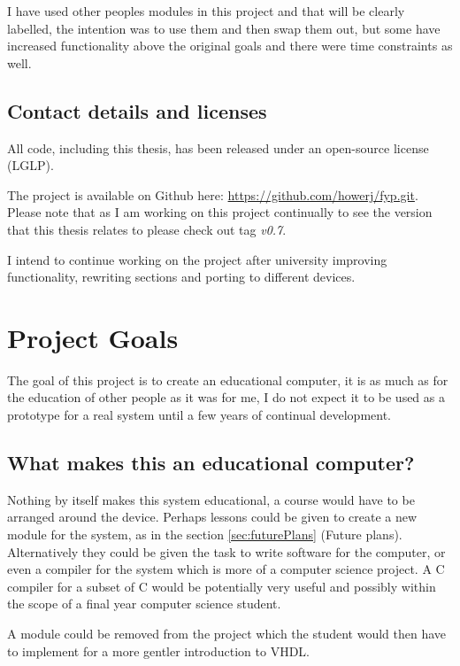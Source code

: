 \documentclass	[a4paper, 10pt]	{article}
\begin{document}
  I have used other peoples modules in this project and that will be clearly labelled,
  the intention was to use them and then swap them out, but some have increased
  functionality above the original goals and there were time constraints as well.

  \subsection{Contact details and licenses}

  All code, including this thesis, has been released under an open-source
  license (LGLP).

  The project is available on Github here: \url{https://github.com/howerj/fyp.git}. Please
  note that as I am working on this project continually to see the version that this
  thesis relates to please check out tag \emph{v0.7}.

  I intend to continue working on the project after university improving functionality,
  rewriting sections and porting to different devices.

  \section{Project Goals}

  The goal of this project is to create an educational computer, it is as much as
  for the education of other people as it was for me, I do not expect it to be used
  as a prototype for a real system until a few years of continual development.

    \subsection{What makes this an educational computer?}

    Nothing by itself makes this system educational, a course would have to be
    arranged around the device. Perhaps lessons could be given to create a new module
    for the system, as in the section \ref{sec:futurePlans} (Future plans). Alternatively
    they could be given the task to write software for the computer, or even a compiler
    for the system which is more of a computer science project. A C compiler for a
    subset of C would be potentially very useful and possibly within the scope of
    a final year computer science student.

    A module could be removed from the project which the student would then have to
    implement for a more gentler introduction to VHDL. 
\end{document}
